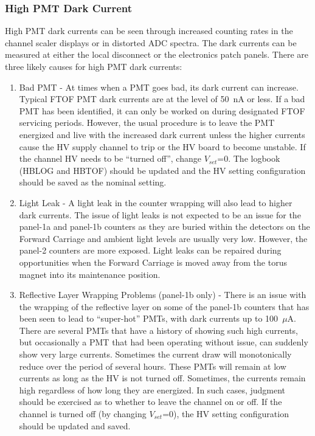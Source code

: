 \documentclass[12pt]{article}
\begin{document}
\subsubsection{High PMT Dark Current}
\label{high-current}

High PMT dark currents can be seen through increased counting rates in the channel 
scaler displays or in distorted ADC spectra. The dark currents can be measured at 
either the local disconnect or the electronics patch panels. There are three likely 
causes for high PMT dark currents:

\begin{enumerate}
\item Bad PMT - At times when a PMT goes bad, its dark current can increase. Typical 
FTOF PMT dark currents are at the level of 50~nA or less. If a bad PMT has been 
identified, it can only be worked on during designated FTOF servicing periods. However, 
the usual procedure is to leave the PMT energized and live with the increased dark 
current unless the higher currents cause the HV supply channel to trip or the HV
board to become unstable. If the channel HV needs to be ``turned off'', change
$V_{set}$=0. The logbook (HBLOG and HBTOF) should be updated and the HV setting
configuration should be saved as the nominal setting.
\item Light Leak - A light leak in the counter wrapping will also lead to higher dark 
currents. The issue of light leaks is not expected to be an issue for the panel-1a and 
panel-1b counters as they are buried within the detectors on the Forward Carriage and 
ambient light levels are usually very low. However, the panel-2 counters are more 
exposed. Light leaks can be repaired during opportunities when the Forward Carriage is 
moved away from the torus magnet into its maintenance position.
\item Reflective Layer Wrapping Problems (panel-1b only) - There is an issue with the 
wrapping of the reflective layer on some of the panel-1b counters that has been seen to 
lead to ``super-hot'' PMTs, with dark currents up to 100~$\mu$A. There are several PMTs 
that have a history of showing such high currents, but occasionally a PMT that had been 
operating without issue, can suddenly show very large currents. Sometimes the current 
draw will monotonically reduce over the period of several hours. These PMTs will remain 
at low currents as long as the HV is not turned off. Sometimes, the currents remain high 
regardless of how long they are energized. In such cases, judgment should be exercised 
as to whether to leave the channel on or off. If the channel is turned off (by
changing $V_{set}$=0), the HV setting configuration should be updated and saved.
\end{enumerate}
\end{document}

